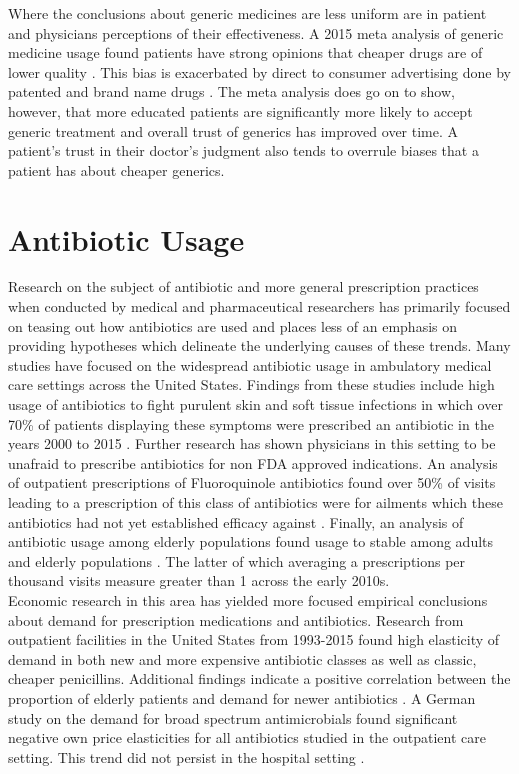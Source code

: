 \indent Where the conclusions about generic medicines are less uniform are in patient and physicians perceptions of their effectiveness. A 2015 meta analysis of generic medicine usage found patients have strong opinions that cheaper drugs are of lower quality \cite{dunne_what_2015}. This bias is exacerbated by direct to consumer advertising done by patented and brand name drugs \cite{morgan_economics_2003}. The meta analysis does go on to show, however, that more educated patients are significantly more likely to accept generic treatment and overall trust of generics has improved over time. A patient's trust in their doctor's judgment also tends to overrule biases that a patient has about cheaper generics.

\section{Antibiotic Usage}
Research on the subject of antibiotic and more general prescription practices when conducted by medical and pharmaceutical researchers has primarily focused on teasing out how antibiotics are used and places less of an emphasis on providing hypotheses which delineate the underlying causes of these trends. Many studies have focused on the widespread antibiotic usage in ambulatory medical care settings across the United States. Findings from these studies include high usage of antibiotics to fight purulent skin and soft tissue infections in which over 70\% of patients displaying these symptoms were prescribed an antibiotic in the years 2000 to 2015 \cite{fritz_national_2020}. Further research has shown physicians in this setting to be unafraid to prescribe antibiotics for non FDA approved indications. An analysis of outpatient prescriptions of Fluoroquinole antibiotics found over 50\% of visits leading to a prescription of this class of antibiotics were for ailments which these antibiotics had not yet established efficacy against \cite{almalki_off-label_2016}. Finally, an analysis of antibiotic usage among elderly populations found usage to stable among adults \cite{roumie_trends_2005} and elderly populations \cite{kabbani_outpatient_2018}. The latter of which averaging a prescriptions per thousand visits measure greater than 1 across the early 2010s.\\
\indent Economic research in this area has yielded more focused empirical conclusions about demand for prescription medications and antibiotics. Research from outpatient facilities in the United States from 1993-2015 found high elasticity of demand in both new and more expensive antibiotic classes as well as classic, cheaper penicillins. Additional findings indicate a positive correlation between the proportion of elderly patients and demand for newer antibiotics \cite{kianmehr_system_2020}. A German study on the demand for broad spectrum antimicrobials found significant negative own price elasticities for all antibiotics studied in the outpatient care setting. This trend did not persist in the hospital setting \cite{kaier_impact_2013}.\\

